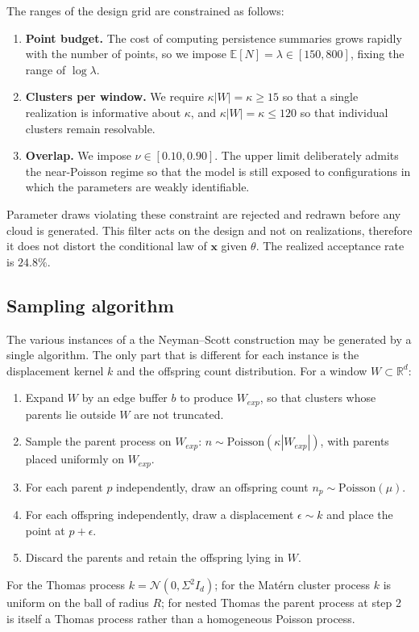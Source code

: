 \documentclass[11pt,letterpaper]{article}
\newcommand{\R}{\mathbb{R}}
\newcommand{\1}{\mathds{1}}
\newcommand{\pc}{\mathbf{x}}
\newcommand{\simpcom}{\Sigma}
\theoremstyle{plain}
\theoremstyle{definitioncolon}
\begin{document}
The ranges of the design grid are constrained as follows:
    \begin{enumerate}
        \item \textbf{Point budget.} The cost of computing persistence summaries
        grows rapidly with the number of points, so we impose
        $\mathbb{E}[N] = \lambda \in [150, 800]$, fixing the range of
        $\log\lambda$.
        \item \textbf{Clusters per window.} We require $\kappa|W| = \kappa \geq 15$
        so that a single realization is informative about $\kappa$, and
        $\kappa|W| = \kappa \leq 120$ so that individual clusters remain
        resolvable.
        \item \textbf{Overlap.} We impose $\nu \in [0.10, 0.90]$. The upper
        limit deliberately admits the near-Poisson regime so that the model is
        still exposed to configurations in which the parameters are weakly
        identifiable.
    \end{enumerate}
Parameter draws violating these constraint are rejected and redrawn before any
cloud is generated. This filter acts on the design and not on realizations,
therefore it does not distort the conditional law of $\pc$ given $\theta$. The
realized acceptance rate is $24.8\%$.

\subsection{Sampling algorithm}
The various instances of a the Neyman--Scott construction may be generated by a
single algorithm. The only part that is different for each instance is the
displacement kernel $k$ and the offspring count distribution. For a window
$W \subset \R^d$:
    \begin{enumerate}
        \item Expand $W$ by an edge buffer $b$ to produce $W_{exp}$, so that
        clusters whose parents lie outside $W$ are not truncated.
        \item Sample the parent process on $W_{exp}$:
        $n \sim \mathrm{Poisson}(\kappa|W_{exp}|)$, with parents placed uniformly
        on $W_{exp}$.
        \item For each parent $p$ independently, draw an offspring count
        $n_p \sim \mathrm{Poisson}(\mu)$.
        \item For each offspring independently, draw a displacement
        $\epsilon \sim k$ and place the point at $p + \epsilon$.
        \item Discard the parents and retain the offspring lying in $W$.
    \end{enumerate}
For the Thomas process $k = \mathcal{N}(0, \simpcom^2 I_d)$; for the Mat\'ern
cluster process $k$ is uniform on the ball of radius $R$; for nested Thomas the
parent process at step 2 is itself a Thomas process rather than a homogeneous
Poisson process.
\end{document}
